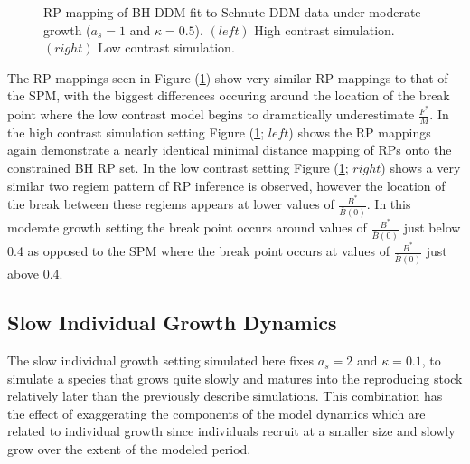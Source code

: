 \begin{figure}[h!]
\begin{minipage}[h!]{0.09\textwidth}
\end{minipage}
\caption{
RP mapping of BH DDM fit to Schnute DDM data under moderate growth ($a_s=1$ and $\kappa=0.5$).
$(left)$ High contrast simulation.
$(right)$ Low contrast simulation.
}\label{moderateGrowth}
\end{figure}

%
The RP mappings seen in Figure (\ref{moderateGrowth}) show very similar RP mappings
to that of the SPM, with the biggest differences occuring
around the location of the break point where the low contrast model begins to
dramatically underestimate $\frac{F^*}{M}$.
%
In the high contrast simulation setting Figure (\ref{moderateGrowth}; $left$) shows
the RP mappings again demonstrate a nearly identical minimal distance mapping of
RPs onto the constrained BH RP set. In the low contrast setting Figure (\ref{moderateGrowth}; $right$) 
shows a very similar two regiem pattern of RP inference is observed, however the
location of the break between these regiems appears at lower values of
$\frac{B^*}{\bar B(0)}$. In this moderate growth setting the break point
occurs around values of $\frac{B^*}{\bar B(0)}$ just below 0.4 as opposed to 
the SPM where the break point occurs at values of $\frac{B^*}{\bar B(0)}$ just above 0.4.


\subsection{Slow Individual Growth Dynamics}

%
The slow individual growth setting simulated here fixes $a_s=2$ and $\kappa=0.1$, to
simulate a species that grows quite slowly and matures into the reproducing  
stock relatively later than the previously describe simulations. This combination has 
the effect of exaggerating the components of the model dynamics which are related to
individual growth since individuals recruit at a smaller size and slowly
grow over the extent of the modeled period.

